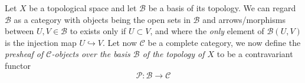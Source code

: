 \documentclass[12pt]{article}
\newcommand\Ccal{\mathcal{C}}
\renewcommand\P{\mathcal{P}}
\begin{document}
Let $X$ be a topological space and let $\mathcal B$ be a basis of its topology. We can regard $\mathcal B$ as a category
with objects being the open sets in $\mathcal B$ and arrows/morphisms between $U,V\in\mathcal B$ to exists only if $U\subset V$, and 
where the \emph{only} element of $\mathcal B(U,V)$ is the injection map $U\hookrightarrow V$. Let now $\Ccal$ be a complete 
 category, we now define the 
\emph{presheaf of $\Ccal$-objects over the basis $\mathcal B$ of the topology of $X$} to be a contravariant functor
$$\P:\mathcal B\rightarrow \Ccal$$

\end{document}
